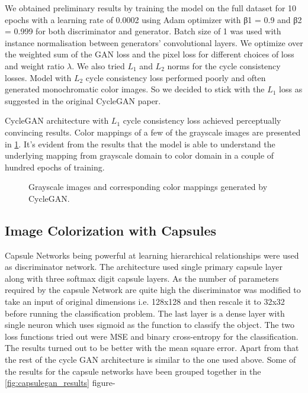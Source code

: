 \documentclass{article} %
\begin{document}
We obtained preliminary results by training the model on the full dataset for 10 epochs with a learning rate of 0.0002 using Adam optimizer\cite{adam} with β1 = 0.9 and β2 = 0.999 for both discriminator and generator. Batch size of 1 was used with instance normalisation between generators' convolutional layers. We optimize over the weighted sum of the GAN loss and the pixel loss for different choices of loss and weight ratio $\lambda$. We also tried $L_1$ and $L_2$ norms for the cycle consistency losses. Model with $L_2$ cycle consistency loss performed poorly and often generated monochromatic color images. So we decided to stick with the $L_1$ loss as suggested in the original CycleGAN paper\cite{cyclegan}.

CycleGAN architecture with $L_1$ cycle consistency loss achieved perceptually convincing results. Color mappings of a few of the grayscale images are presented in \ref{fig:cyclegan_results}. It's evident from the results that the model is able to understand the underlying mapping from grayscale domain to color domain in a couple of hundred epochs of training. 

\begin{figure}[!htb]
	\begin{center}
	\end{center}
	\caption{Grayscale images and corresponding color mappings generated by CycleGAN.}
	\label{fig:cyclegan_results}
\end{figure}

\subsection{Image Colorization with Capsules}

Capsule Networks being powerful at learning hierarchical relationships were used as discriminator network. The architecture used single primary capsule layer along with three softmax digit capsule layers. As the number of parameters required by the capsule Network are quite high the discriminator was modified to take an input of original dimensions i.e. 128x128 and then rescale it to 32x32 before running the classification problem. The last layer is a dense layer with single neuron which uses sigmoid as the function to classify the object. The two loss functions tried out were MSE and binary cross-entropy for the classification. The results turned out to be better with the mean square error. Apart from that the rest of the cycle GAN architecture is similar to the one used above. Some of the results for the capsule networks have been grouped together in the \ref{fig:capsulegan_results} figure-
\end{document}
